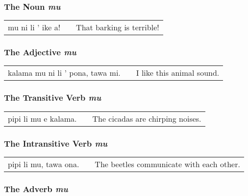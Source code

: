 \subsubsection*{The Noun \textit{mu}}

\begin{supertabular}{p{5,5cm}|ll}
    mu ni li ' ike a! &  & That barking is terrible! \\
\end{supertabular}

%
\subsubsection*{The Adjective  \textit{mu}}

\begin{supertabular}{p{5,5cm}|ll}
    kalama mu ni li ' pona, tawa mi. &  & I like this animal sound. \\
\end{supertabular}

%
\subsubsection*{The Transitive Verb \textit{mu}}

\begin{supertabular}{p{5,5cm}|ll}
    pipi li mu e kalama. &  & The cicadas are chirping noises. \\
\end{supertabular}

%
\subsubsection*{The Intransitive Verb \textit{mu}}

\begin{supertabular}{p{5,5cm}|ll}
    pipi li mu, tawa ona. &  & The beetles communicate with each other. \\
\end{supertabular}

%
\subsubsection*{The Adverb \textit{mu}}

